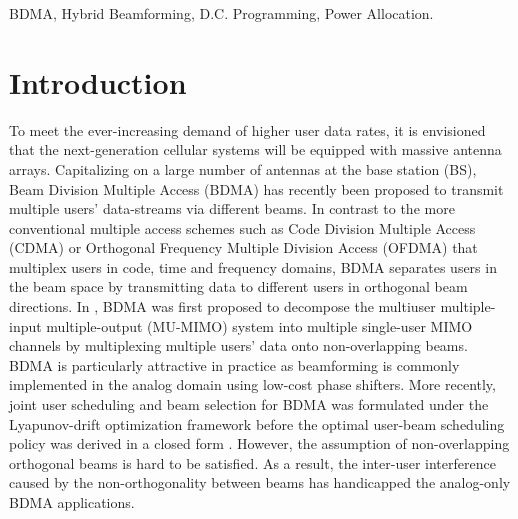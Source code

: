 \documentclass[10pt,journal,twocolumn,twoside]{IEEEtran}
\begin{document}
\begin{IEEEkeywords}
	BDMA, Hybrid Beamforming, D.C. Programming, Power Allocation.
\end{IEEEkeywords}



\section{Introduction}\label{sec:introduction}
To meet the ever-increasing demand of higher user data rates, it is envisioned that the next-generation cellular systems will be equipped with massive antenna arrays. Capitalizing on a large number of antennas at the base station (BS), Beam Division Multiple Access (BDMA) has recently been proposed to transmit multiple users' data-streams via different beams. In contrast to the more conventional multiple access schemes such as Code Division Multiple Access (CDMA) or Orthogonal Frequency Multiple Division Access (OFDMA) that multiplex users in code, time and frequency domains, BDMA separates users in the beam space by transmitting data to different users in orthogonal beam directions. In \cite{sun2015beam}, BDMA was first proposed to decompose the multiuser multiple-input multiple-output (MU-MIMO) system into multiple single-user MIMO channels by multiplexing multiple users' data onto non-overlapping beams. BDMA is particularly attractive in practice as beamforming is commonly implemented in the analog domain using low-cost phase shifters. More recently, joint user scheduling and beam selection for BDMA was formulated under the Lyapunov-drift optimization framework before the optimal user-beam scheduling policy was derived in a closed form \cite{Jiang2018}. However, the assumption of non-overlapping orthogonal beams is hard to be satisfied. As a result, the inter-user interference caused by the non-orthogonality between beams has handicapped the analog-only BDMA applications.
\end{document}
